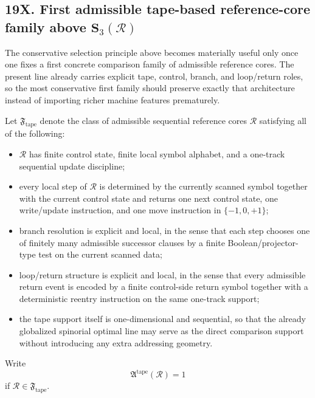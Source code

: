 \subsection*{19X. First admissible tape-based reference-core family above \(\mathbf S_3(\mathcal R)\)}
The conservative selection principle above becomes materially useful only once one fixes a first concrete comparison family of admissible reference cores. The present line already carries explicit tape, control, branch, and loop/return roles, so the most conservative first family should preserve exactly that architecture instead of importing richer machine features prematurely.

\begin{definition}
Let \(\mathfrak F_{\mathrm{tape}}\) denote the class of admissible sequential reference cores \(\mathcal R\) satisfying all of the following:
\begin{itemize}[leftmargin=2em]
 \item \(\mathcal R\) has finite control state, finite local symbol alphabet, and a one-track sequential update discipline;
 \item every local step of \(\mathcal R\) is determined by the currently scanned symbol together with the current control state and returns one next control state, one write/update instruction, and one move instruction in \(\{-1,0,+1\}\);
 \item branch resolution is explicit and local, in the sense that each step chooses one of finitely many admissible successor clauses by a finite Boolean/projector-type test on the current scanned data;
 \item loop/return structure is explicit and local, in the sense that every admissible return event is encoded by a finite control-side return symbol together with a deterministic reentry instruction on the same one-track support;
 \item the tape support itself is one-dimensional and sequential, so that the already globalized spinorial optimal line may serve as the direct comparison support without introducing any extra addressing geometry.
\end{itemize}
Write
\[
\mathfrak A^{\mathrm{tape}}(\mathcal R)=1
\]
if \(\mathcal R\in\mathfrak F_{\mathrm{tape}}\).
\end{definition}

